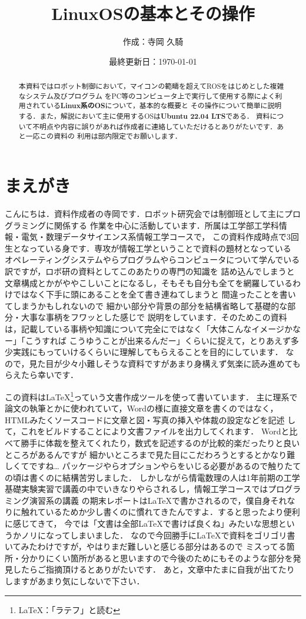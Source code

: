 \documentclass[autodetect-engine,dvi=dvipdfmx,ja=standard,a4j]{bxjsarticle}
\title{\textbf{LinuxOSの基本とその操作}}
\author{作成：寺岡 久騎}
\date{最終更新日：\today}
\begin{document}
\maketitle

\begin{abstract}
    本資料ではロボット制御において，マイコンの範疇を超えてROSをはじめとした複雑なシステム及びプログラム
    をPC等のコンピュータ上で実行して使用する際によく利用されている\textbf{Linux系のOS}について，基本的な概要と
    その操作について簡単に説明する．また，解説において主に使用するOSは\textbf{Ubuntu 22.04 LTS}である．
    資料について不明点や内容に誤りがあれば作成者に連絡していただけるとありがたいです．あと一応この資料の
    利用は部内限定でお願いします．
\end{abstract}
\tableofcontents

\clearpage
\part*{まえがき}
こんにちは．資料作成者の寺岡です．ロボット研究会では制御班として主にプログラミングに関係する
作業を中心に活動しています．所属は工学部工学科情報・電気・数理データサイエンス系情報工学コースで，
この資料作成時点で3回生となっている身です．専攻が情報工学ということで資料の題材となっている
オペレーティングシステムやらプログラムやらコンピュータについて学んでいる訳ですが，ロボ研の資料としてこのあたりの専門の知識を
詰め込んでしまうと文章構成とかがややこしいことになるし，そもそも自分も全てを網羅しているわけではなく下手に頭にあることを全て書き連ねてしまうと
間違ったことを書いてしまうかもしれないので
細かい部分や背景の部分を結構省略して基礎的な部分・大事な事柄をフワッとした感じで
説明をしています．そのためこの資料は，記載している事柄や知識について完全にではなく「大体こんなイメージかなー」「こうすれば
こうゆうことが出来るんだー」くらいに捉えて，とりあえず多少実践にもっていけるくらいに理解してもらえることを目的にしています．
なので，見た目が少々小難しそうな資料ですがあまり身構えず気楽に読み進めてもらえたら幸いです．

この資料は{\LaTeX}\footnote{LaTeX：「ラテフ」と読む}っていう文書作成ツールを使って書いています．
主に理系で論文の執筆とかに使われていて，Wordの様に直接文章を書くのではなく，HTMLみたくソースコードに文章と図・写真の挿入や体裁の設定などを記述
して，これをビルドすることにより文書ファイルを出力してくれます．
Wordと比べて勝手に体裁を整えてくれたり，数式を記述するのが比較的楽だったりと良いところがあるんですが
細かいところまで見た目にこだわろうとするとかなり難しくてですね\dots
パッケージやらオプションやらをいじる必要があるので触りたての頃は書くのに結構苦労しました．
しかしながら情電数理の人は1年前期の工学基礎実験実習で講義の中でいきなりやらされるし，情報工学コースではプログラミング演習系の講義
の期末レポートは{\LaTeX}で書かされるので，僕自身それなりに触れているためか少し書くのに慣れてきたんですよ．すると思ったより便利に感じてきて，
今では「文書は全部{\LaTeX}で書けば良くね」みたいな思想というかノリになってしまいました．
なので今回勝手に{\LaTeX}で資料をゴリゴリ書いてみたわけですが，やはりまだ難しいと感じる部分はあるので
ミスってる箇所・分かりにくい箇所があると思いますので今後のためにもそのような部分を発見したらご指摘頂けるとありがたいです．
あと，文章中たまに自我が出てたりしますがあまり気にしないで下さい．
\clearpage
\end{document}
